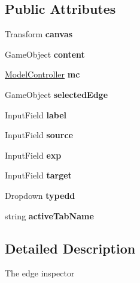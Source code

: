 \subsection*{Public Attributes}
\begin{DoxyCompactItemize}
\item 
\mbox{\label{class_edge_inspector_aef5538a8549c97fd20dc29883515fef6}} 
Transform {\bfseries canvas}
\item 
\mbox{\label{class_edge_inspector_ab8ddb57092c75c120e99bd7c14235f92}} 
Game\+Object {\bfseries content}
\item 
\mbox{\label{class_edge_inspector_a9ddd0f1774c0255e2a28c62dab834dc7}} 
\hyperlink{class_model_controller}{Model\+Controller} {\bfseries mc}
\item 
\mbox{\label{class_edge_inspector_a407d4896703cf2b1ad9df82215401cb1}} 
Game\+Object {\bfseries selected\+Edge}
\item 
\mbox{\label{class_edge_inspector_a3c05353b79341451a68e4371a073d135}} 
Input\+Field {\bfseries label}
\item 
\mbox{\label{class_edge_inspector_a1682bdf6df01a5f678bb724ffb570178}} 
Input\+Field {\bfseries source}
\item 
\mbox{\label{class_edge_inspector_ae5ad1583e1de5f55731dc23f7873f371}} 
Input\+Field {\bfseries exp}
\item 
\mbox{\label{class_edge_inspector_ae3cc5d7ce122499fd60573b0290c66d1}} 
Input\+Field {\bfseries target}
\item 
\mbox{\label{class_edge_inspector_af8e567cee5b567dcdbdfc7b2f96fe84d}} 
Dropdown {\bfseries typedd}
\item 
\mbox{\label{class_edge_inspector_a6a8258041c8542711dd7f08b4ba9ee95}} 
string {\bfseries active\+Tab\+Name}
\end{DoxyCompactItemize}


\subsection{Detailed Description}
The edge inspector 



